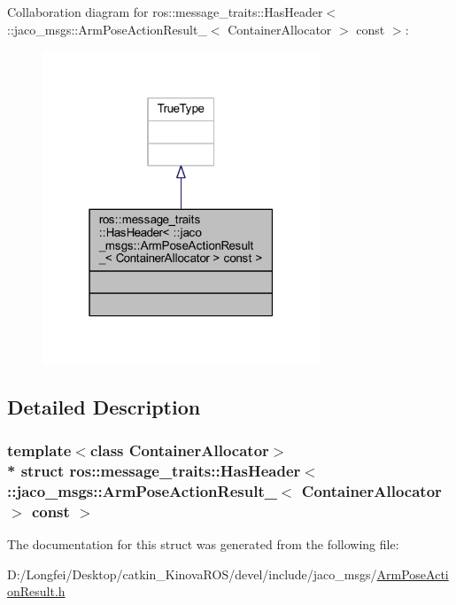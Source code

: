 Collaboration diagram for ros\+:\+:message\+\_\+traits\+:\+:Has\+Header$<$ \+:\+:jaco\+\_\+msgs\+:\+:Arm\+Pose\+Action\+Result\+\_\+$<$ Container\+Allocator $>$ const $>$\+:
\nopagebreak
\begin{figure}[H]
\begin{center}
\leavevmode
\includegraphics[width=235pt]{de/d4b/structros_1_1message__traits_1_1HasHeader_3_01_1_1jaco__msgs_1_1ArmPoseActionResult___3_01Contai35d3be233ec2112d61dd7545155d4ce3}
\end{center}
\end{figure}


\subsection{Detailed Description}
\subsubsection*{template$<$class Container\+Allocator$>$\\*
struct ros\+::message\+\_\+traits\+::\+Has\+Header$<$ \+::jaco\+\_\+msgs\+::\+Arm\+Pose\+Action\+Result\+\_\+$<$ Container\+Allocator $>$ const  $>$}



The documentation for this struct was generated from the following file\+:\begin{DoxyCompactItemize}
\item 
D\+:/\+Longfei/\+Desktop/catkin\+\_\+\+Kinova\+R\+O\+S/devel/include/jaco\+\_\+msgs/\hyperlink{ArmPoseActionResult_8h}{Arm\+Pose\+Action\+Result.\+h}\end{DoxyCompactItemize}
